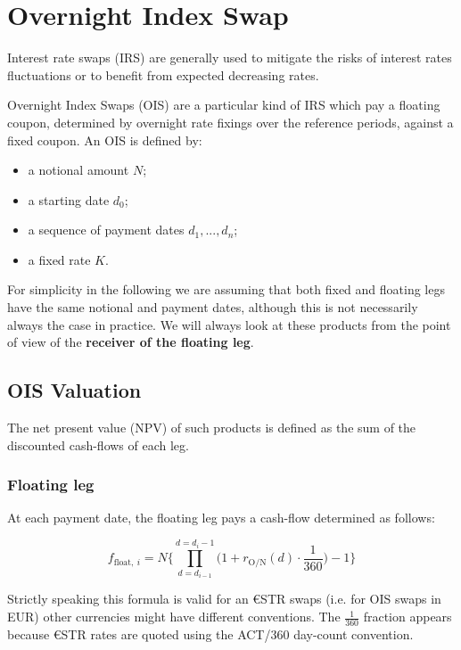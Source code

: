 \section{Overnight Index Swap}\label{overnight-index-swap}

Interest rate swaps (IRS) are generally used to mitigate the risks of interest rates fluctuations or to benefit from expected decreasing rates.

Overnight Index Swaps (OIS) are a particular kind of IRS which pay a floating coupon, determined by overnight rate fixings over the reference periods, against a fixed coupon. An OIS is defined by:

\begin{itemize}
\tightlist
\item
  a notional amount $N$;
\item
  a starting date $d_0$;
\item
  a sequence of payment dates $d_1,...,d_n$;
\item
  a fixed rate $K$.
\end{itemize}

For simplicity in the following we are assuming that both fixed and floating legs have the same notional and payment dates, although this is not necessarily always the case in practice. We will always look at these products from the point of view of the \textbf{receiver of the floating leg}.

\subsection{OIS Valuation}\label{ois-valuation}
The net present value (NPV) of such products is defined as the sum of the discounted cash-flows of each leg.

\subsubsection{Floating leg}\label{floating-leg}
At each payment date, the floating leg pays a cash-flow determined as follows:

\begin{equation}
f_{\mathrm{float},~i} = N \Bigg\{\prod_{d=d_{i-1}}^{d=d_i-1}\Big(1+r_{\mathrm{O/N}}(d)\cdot\frac{1}{360}\Big) -1 \Bigg\}
\label{eq:floating_ois}
\end{equation}

Strictly speaking this formula is valid for an \euro STR swaps (i.e. for OIS swaps in EUR) other currencies might have different conventions. The $\frac{1}{360}$ fraction appears because \euro STR rates are quoted using the ACT/360 day-count convention. 

